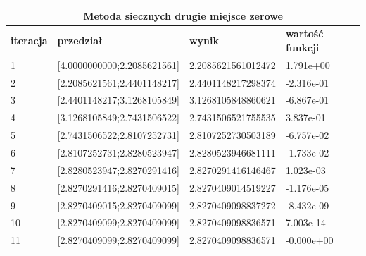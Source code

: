 \documentclass[a4paper, 11pt]{article}
\begin{document}
\begin{table}[H]
\centering
\label{my-label}
\begin{tabular}{llll}
\hline
\multicolumn{4}{c}{\textbf{Metoda siecznych drugie miejsce zerowe}} \\ \hline
\multicolumn{1}{|l|}{\textbf{iteracja}} & \multicolumn{1}{l|}{\textbf{przedział}} & \multicolumn{1}{l|}{\textbf{wynik}} & \multicolumn{1}{l|}{\textbf{wartość funkcji}} \\ \hline
\multicolumn{1}{|l|}{1} & \multicolumn{1}{l|}{{[}4.0000000000;2.2085621561{]}} & \multicolumn{1}{l|}{2.2085621561012472} & \multicolumn{1}{l|}{1.791e+00} \\ \hline
\multicolumn{1}{|l|}{2} & \multicolumn{1}{l|}{{[}2.2085621561;2.4401148217{]}} & \multicolumn{1}{l|}{2.4401148217298374} & \multicolumn{1}{l|}{-2.316e-01} \\ \hline
\multicolumn{1}{|l|}{3} & \multicolumn{1}{l|}{{[}2.4401148217;3.1268105849{]}} & \multicolumn{1}{l|}{3.1268105848860621} & \multicolumn{1}{l|}{-6.867e-01} \\ \hline
\multicolumn{1}{|l|}{4} & \multicolumn{1}{l|}{{[}3.1268105849;2.7431506522{]}} & \multicolumn{1}{l|}{2.7431506521755535} & \multicolumn{1}{l|}{3.837e-01} \\ \hline
\multicolumn{1}{|l|}{5} & \multicolumn{1}{l|}{{[}2.7431506522;2.8107252731{]}} & \multicolumn{1}{l|}{2.8107252730503189} & \multicolumn{1}{l|}{-6.757e-02} \\ \hline
\multicolumn{1}{|l|}{6} & \multicolumn{1}{l|}{{[}2.8107252731;2.8280523947{]}} & \multicolumn{1}{l|}{2.8280523946681111} & \multicolumn{1}{l|}{-1.733e-02} \\ \hline
\multicolumn{1}{|l|}{7} & \multicolumn{1}{l|}{{[}2.8280523947;2.8270291416{]}} & \multicolumn{1}{l|}{2.8270291416146467} & \multicolumn{1}{l|}{1.023e-03} \\ \hline
\multicolumn{1}{|l|}{8} & \multicolumn{1}{l|}{{[}2.8270291416;2.8270409015{]}} & \multicolumn{1}{l|}{2.8270409014519227} & \multicolumn{1}{l|}{-1.176e-05} \\ \hline
\multicolumn{1}{|l|}{9} & \multicolumn{1}{l|}{{[}2.8270409015;2.8270409099{]}} & \multicolumn{1}{l|}{2.8270409098837272} & \multicolumn{1}{l|}{-8.432e-09} \\ \hline
\multicolumn{1}{|l|}{10} & \multicolumn{1}{l|}{{[}2.8270409099;2.8270409099{]}} & \multicolumn{1}{l|}{2.8270409098836571} & \multicolumn{1}{l|}{7.003e-14} \\ \hline
\multicolumn{1}{|l|}{11} & \multicolumn{1}{l|}{{[}2.8270409099;2.8270409099{]}} & \multicolumn{1}{l|}{2.8270409098836571} & \multicolumn{1}{l|}{-0.000e+00} \\ \hline
\end{tabular}
\end{table}
\end{document}
